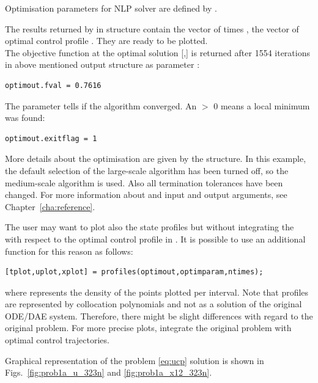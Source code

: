 Optimisation parameters for NLP solver are defined by
. 


The results returned by  in  structure
contain the vector of times , the vector of optimal control
profile . They are ready to be plotted.\\
The objective function at the optimal solution [,]
is returned after 1554 iterations in above mentioned output structure
 as parameter :
\begin{verbatim}
optimout.fval = 0.7616
\end{verbatim}
The parameter  tells if the algorithm converged. An
 $>$ 0 means a local minimum was found: 
\begin{verbatim}
optimout.exitflag = 1
\end{verbatim}
More details about the optimisation are given by the
 structure. In this example, the default
selection of the large-scale algorithm has been turned off, so the
medium-scale algorithm is used. Also all termination tolerances have
been changed. For more information about  and
 input and output arguments, see Chapter~\ref{cha:reference}. 

The user may want to plot also the state profiles but without
integrating the  with respect to the optimal control
profile in . It is possible to use an additional
function  for this reason as follows:
\begin{verbatim}
[tplot,uplot,xplot] = profiles(optimout,optimparam,ntimes);
\end{verbatim}
where  represents the density of the points plotted per
interval. Note that profiles are represented by collocation
polynomials and not as a solution of the original ODE/DAE
system. Therefore, there might be slight differences with regard to
the original problem. For more precise plots, integrate the original
problem with optimal control trajectories.

Graphical representation of the problem \eqref{eq:ucp} solution is
shown in Figs.~\ref{fig:prob1a_u_323n} and \ref{fig:prob1a_x12_323n}. 

